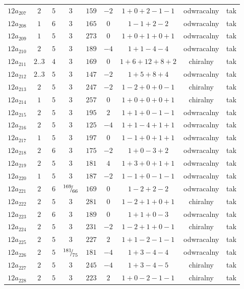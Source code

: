 \begin{longtable}{ccccccccc}
$12a_{207}$ & $2$ & $5$ & $3$ & $159$ & $-2$ & $1+0+2-1-1$ & odwracalny & tak \\
$12a_{208}$ & $1$ & $6$ & $3$ & $165$ & $0$ & $1-1+2-2$ & odwracalny & tak \\
$12a_{209}$ & $1$ & $5$ & $3$ & $273$ & $0$ & $1+0+1+0+1$ & odwracalny & tak \\
$12a_{210}$ & $2$ & $5$ & $3$ & $189$ & $-4$ & $1+1-4-4$ & odwracalny & tak \\
$12a_{211}$ & $2..3$ & $4$ & $3$ & $169$ & $0$ & $1+6+12+8+2$ & chiralny & tak \\
$12a_{212}$ & $2..3$ & $5$ & $3$ & $147$ & $-2$ & $1+5+8+4$ & odwracalny & tak \\
$12a_{213}$ & $2$ & $5$ & $3$ & $247$ & $-2$ & $1-2+0+0-1$ & chiralny & tak \\
$12a_{214}$ & $1$ & $5$ & $3$ & $257$ & $0$ & $1+0+0+0+1$ & chiralny & tak \\
$12a_{215}$ & $2$ & $5$ & $3$ & $195$ & $2$ & $1+1+0-1-1$ & odwracalny & tak \\
$12a_{216}$ & $2$ & $5$ & $3$ & $125$ & $-4$ & $1+1-4+1+1$ & odwracalny & tak \\
$12a_{217}$ & $1$ & $5$ & $3$ & $197$ & $0$ & $1-1+0+1+1$ & odwracalny & tak \\
$12a_{218}$ & $2$ & $6$ & $3$ & $175$ & $-2$ & $1+0-3+2$ & odwracalny & tak \\
$12a_{219}$ & $2$ & $5$ & $3$ & $181$ & $4$ & $1+3+0+1+1$ & odwracalny & tak \\
$12a_{220}$ & $1$ & $5$ & $3$ & $187$ & $-2$ & $1-1+0-1-1$ & odwracalny & tak \\
$12a_{221}$ & $2$ & $6$ & ${}^{169}{\mskip -5mu/\mskip -3mu}_{66}$ & $169$ & $0$ & $1-2+2-2$ & odwracalny & tak \\
$12a_{222}$ & $2$ & $5$ & $3$ & $281$ & $0$ & $1-2+1+0+1$ & chiralny & tak \\
$12a_{223}$ & $2$ & $6$ & $3$ & $189$ & $0$ & $1+1+0-3$ & odwracalny & tak \\
$12a_{224}$ & $2$ & $5$ & $3$ & $231$ & $-2$ & $1-2+1+0-1$ & chiralny & tak \\
$12a_{225}$ & $2$ & $5$ & $3$ & $227$ & $2$ & $1+1-2-1-1$ & odwracalny & tak \\
$12a_{226}$ & $2$ & $5$ & ${}^{181}{\mskip -5mu/\mskip -3mu}_{75}$ & $181$ & $-4$ & $1+3-4-4$ & odwracalny & tak \\
$12a_{227}$ & $2$ & $5$ & $3$ & $245$ & $-4$ & $1+3-4-5$ & chiralny & tak \\
$12a_{228}$ & $2$ & $5$ & $3$ & $223$ & $2$ & $1+0-2-1-1$ & chiralny & tak \\

\end{longtable}
